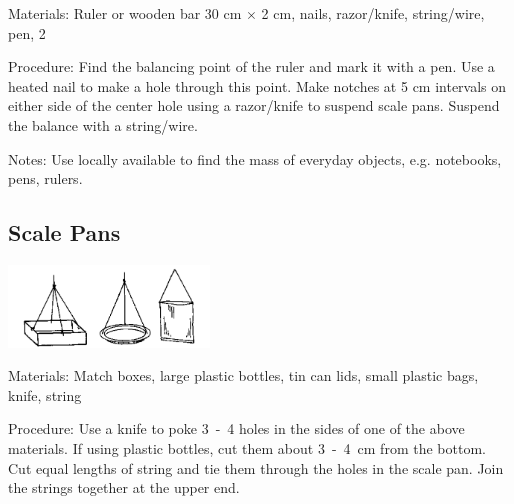 \begin{multicols}{2}
\begin{description*}
\item[Materials:]{Ruler or wooden bar 30 cm $\times$ 2 cm, nails, razor/knife, string/wire, pen, 2 }
\item[Procedure:]{Find the balancing point of the ruler and mark it with a pen. Use a heated nail to make a hole through this point. Make notches at 5 cm intervals on either side of the center hole using a razor/knife to suspend scale pans. Suspend the balance with a string/wire.}
\item[Notes:]{Use locally available  to find the mass of everyday objects, e.g. notebooks, pens, rulers.}
\end{description*}

\columnbreak

\subsection{Scale Pans}
\label{sub:scalepans}

\begin{center}
\includegraphics[width=0.4\textwidth]{./img/source/scale-pans.png}
\end{center}

\begin{description*}
\item[Materials:]{Match boxes, large plastic bottles, tin can lids, small plastic bags, knife, string}
\item[Procedure:]{Use a knife to poke 3~-~4 holes in the sides of one of the above materials. If using plastic bottles, cut them about 3~-~4~cm from the bottom. Cut equal lengths of string and tie them through the holes in the scale pan. Join the strings together at the upper end. }
\end{description*}


\end{multicols}
